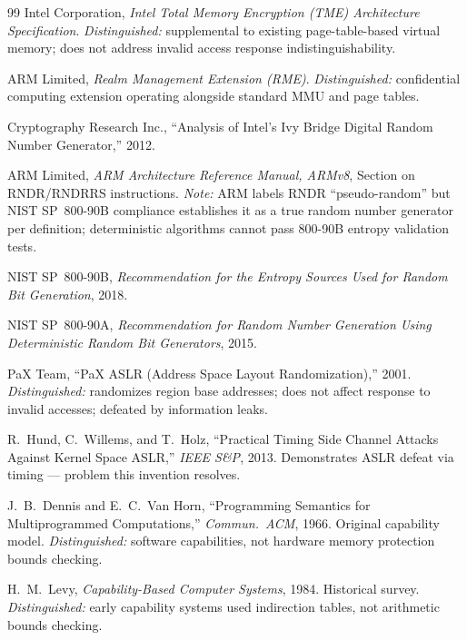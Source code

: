 \documentclass[12pt,letterpaper]{article}
\begin{document}
\begin{thebibliography}{99}
  Intel Corporation,
  \textit{Intel Total Memory Encryption (TME) Architecture Specification}.
  \textit{Distinguished:} supplemental to existing page-table-based
  virtual memory; does not address invalid access response
  indistinguishability.

  ARM Limited,
  \textit{Realm Management Extension (RME)}.
  \textit{Distinguished:} confidential computing extension operating
  alongside standard MMU and page tables.

  Cryptography Research Inc.,
  ``Analysis of Intel's Ivy Bridge Digital Random Number Generator,'' 2012.

  ARM Limited,
  \textit{ARM Architecture Reference Manual, ARMv8},
  Section on RNDR/RNDRRS instructions.
  \textit{Note:} ARM labels RNDR ``pseudo-random'' but NIST SP~800-90B
  compliance establishes it as a true random number generator per
  definition; deterministic algorithms cannot pass 800-90B entropy
  validation tests.

  NIST SP~800-90B,
  \textit{Recommendation for the Entropy Sources Used for Random Bit
  Generation}, 2018.

  NIST SP~800-90A,
  \textit{Recommendation for Random Number Generation Using Deterministic
  Random Bit Generators}, 2015.

  PaX Team,
  ``PaX ASLR (Address Space Layout Randomization),'' 2001.
  \textit{Distinguished:} randomizes region base addresses; does not
  affect response to invalid accesses; defeated by information leaks.

  R.~Hund, C.~Willems, and T.~Holz,
  ``Practical Timing Side Channel Attacks Against Kernel Space ASLR,''
  \textit{IEEE S\&P}, 2013.
  Demonstrates ASLR defeat via timing --- problem this invention resolves.

  J.~B.~Dennis and E.~C.~Van Horn,
  ``Programming Semantics for Multiprogrammed Computations,''
  \textit{Commun.\ ACM}, 1966.
  Original capability model.
  \textit{Distinguished:} software capabilities, not hardware memory
  protection bounds checking.

  H.~M.~Levy,
  \textit{Capability-Based Computer Systems}, 1984.
  Historical survey.
  \textit{Distinguished:} early capability systems used indirection
  tables, not arithmetic bounds checking.

\end{thebibliography}
\end{document}
